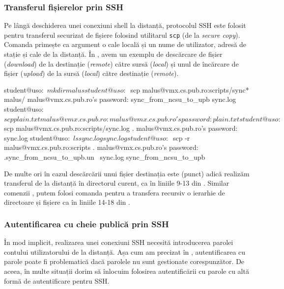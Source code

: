 \subsubsection{Transferul fișierelor prin SSH}
\label{sec:sec:transfer:ssh:transfer}

Pe lângă deschiderea unei conexiuni shell la distanță, protocolul SSH este folosit pentru transferul securizat de fișiere folosind utilitarul \texttt{scp} (de la \textit{secure copy}). Comanda  primește ca argument o cale locală și un nume de utilizator, adresă de stație și cale de la distanță. În , avem un exemplu de descărcare de fișier (\textit{download}) de la destinație (\textit{remote}) către sursă (\textit{local}) și unul de încărcare de fișier (\textit{upload}) de la sursă (\textit{local}) către destinație (\textit{remote}).

\begin{screen}[caption={Transfer de fișiere prin SSH (scp)},label={lst:sec:scp}]
student@uso:~$ mkdir malus
student@uso:~$ scp malus@vmx.cs.pub.ro:scripts/sync* malus/
malus@vmx.cs.pub.ro's password:
sync_from_ncsu_to_upb
sync.log
student@uso:~$ scp plain.txt malus@vmx.cs.pub.ro:
malus@vmx.cs.pub.ro's password:
plain.txt
student@uso:~$ scp malus@vmx.cs.pub.ro:scripts/sync.log .
malus@vmx.cs.pub.ro's password:
sync.log
student@uso:~$ ls sync.log
sync.log
student@uso:~$ scp -r malus@vmx.cs.pub.ro:scripts .
malus@vmx.cs.pub.ro's password:
.sync_from_ncsu_to_upb.un~
sync.log
sync_from_ncsu_to_upb
\end{screen}

De multe ori în cazul descărcării unui fișier destinația este  (punct) adică realizăm transferul de la distanță în directorul curent, ca în liniile 9-13 din . Similar comenzii , putem folosi comanda  pentru a transfera recursiv o ierarhie de directoare și fișiere ca în liniile 14-18 din .

\subsubsection{Autentificarea cu cheie publică prin SSH}
\label{sec:sec:transfer:ssh:pub-auth}

În mod implicit, realizarea unei conexiuni SSH necesită introducerea parolei contului utilizatorului de la distanță.
Așa cum am precizat în , autentificarea cu parole poate fi problematică dacă parolele nu sunt gestionate corespunzător.
De aceea, în multe situații dorim să înlocuim folosirea autentificării cu parole cu altă formă de autentificare pentru SSH.

